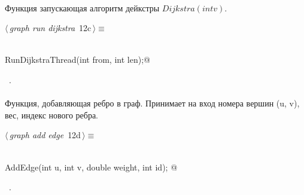 \documentclass[12pt]{article}
\begin{document}
\paragraph{}
Функция запускающая алгоритм дейкстры $Dijkstra(int v)$.
\begin{flushleft} \small
\begin{minipage}{\linewidth}\label{scrap18}\raggedright\small
{} $\langle\,${\itshape graph run dijkstra}\nobreak\ {\footnotesize {12c}}$\,\rangle\equiv$
\vspace{-1ex}
\begin{list}{}{} \item
\mbox{}\verb@@\\
\mbox{}\verb@void RunDijkstraThread(int from, int len);@\\
\mbox{}\verb@@{\NWsep}
\end{list}
\vspace{-1.5ex}
\footnotesize
\begin{list}{}{\setlength{\itemsep}{-\parsep}\setlength{\itemindent}{-\leftmargin}}
\item \NWtxtMacroRefIn\ .

\item{}
\end{list}
\end{minipage}\vspace{4ex}
\end{flushleft}
\paragraph{}
Функция, добавляющая ребро в граф. Принимает на вход номера вершин (u, v), вес, индекс нового ребра.
\begin{flushleft} \small
\begin{minipage}{\linewidth}\label{scrap19}\raggedright\small
{} $\langle\,${\itshape graph add edge}\nobreak\ {\footnotesize {12d}}$\,\rangle\equiv$
\vspace{-1ex}
\begin{list}{}{} \item
\mbox{}\verb@@\\
\mbox{}\verb@void AddEdge(int u, int v, double weight, int id);   @\\
\mbox{}\verb@@{\NWsep}
\end{list}
\vspace{-1.5ex}
\footnotesize
\begin{list}{}{\setlength{\itemsep}{-\parsep}\setlength{\itemindent}{-\leftmargin}}
\item \NWtxtMacroRefIn\ .

\item{}
\end{list}
\end{minipage}\vspace{4ex}
\end{flushleft}
\end{document}
